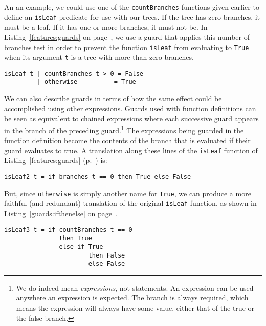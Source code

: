 An an example, we could use one of the \lstinline{countBranches} functions given earlier to define an \lstinline{isLeaf} predicate for use with our trees. If the tree has zero branches, it must be a leaf. If it has one or more branches, it must not be. In Listing~\ref{features:guards} on page~\pageref{features:guards}, we use a guard that applies this number-of-branches test in order to prevent the function \lstinline{isLeaf} from evaluating to \lstinline{True} when its argument \lstinline{t} is a tree with more than zero branches.
\begin{lstlisting}[float,caption={Cases with guards},label={features:guards}]
isLeaf t | countBranches t > 0 = False
         | otherwise          = True
\end{lstlisting}

We can also describe guards in terms of how the same effect could be accomplished using other expressions. Guards used with function definitions can be seen as equivalent to chained  expressions where each successive guard appears in the  branch of the preceding guard.\footnote{We do indeed mean  \emph{expressions}, not  statements. An  expression can be used anywhere an expression is expected. The  branch is always required, which means the expression will always have some value, either that of the true or the false branch.} The expressions being guarded in the function definition become the contents of the  branch that is evaluated if their guard evaluates to true. A translation along these lines of the \lstinline{isLeaf} function of Listing~\ref{features:guards} (p.~\pageref{features:guards}) is:
\begin{lstlisting}
isLeaf2 t = if branches t == 0 then True else False
\end{lstlisting}
But, since \lstinline{otherwise} is simply another name for \lstinline{True}, we can produce a more faithful (and redundant) translation of the original \lstinline{isLeaf} function, as shown in Listing~\ref{guards:ifthenelse} on page~\pageref{guards:ifthenelse}.

\begin{lstlisting}[float,caption={Guards as chained if-then-else--expressions},label={guards:ifthenelse}]
isLeaf3 t = if countBranches t == 0
               then True
               else if True 
                       then False  
                       else False
\end{lstlisting}

